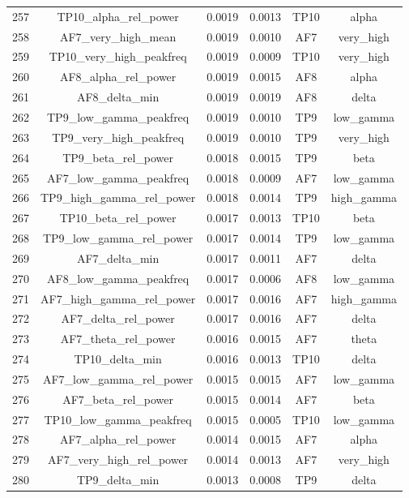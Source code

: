 \begin{table}[hptb]
\begin{table}
\begin{tabular}{cccccc}
257 & TP10_alpha_rel_power & 0.0019 & 0.0013 & TP10 & alpha \\
258 & AF7_very_high_mean & 0.0019 & 0.0010 & AF7 & very_high \\
259 & TP10_very_high_peakfreq & 0.0019 & 0.0009 & TP10 & very_high \\
260 & AF8_alpha_rel_power & 0.0019 & 0.0015 & AF8 & alpha \\
261 & AF8_delta_min & 0.0019 & 0.0019 & AF8 & delta \\
262 & TP9_low_gamma_peakfreq & 0.0019 & 0.0010 & TP9 & low_gamma \\
263 & TP9_very_high_peakfreq & 0.0019 & 0.0010 & TP9 & very_high \\
264 & TP9_beta_rel_power & 0.0018 & 0.0015 & TP9 & beta \\
265 & AF7_low_gamma_peakfreq & 0.0018 & 0.0009 & AF7 & low_gamma \\
266 & TP9_high_gamma_rel_power & 0.0018 & 0.0014 & TP9 & high_gamma \\
267 & TP10_beta_rel_power & 0.0017 & 0.0013 & TP10 & beta \\
268 & TP9_low_gamma_rel_power & 0.0017 & 0.0014 & TP9 & low_gamma \\
269 & AF7_delta_min & 0.0017 & 0.0011 & AF7 & delta \\
270 & AF8_low_gamma_peakfreq & 0.0017 & 0.0006 & AF8 & low_gamma \\
271 & AF7_high_gamma_rel_power & 0.0017 & 0.0016 & AF7 & high_gamma \\
272 & AF7_delta_rel_power & 0.0017 & 0.0016 & AF7 & delta \\
273 & AF7_theta_rel_power & 0.0016 & 0.0015 & AF7 & theta \\
274 & TP10_delta_min & 0.0016 & 0.0013 & TP10 & delta \\
275 & AF7_low_gamma_rel_power & 0.0015 & 0.0015 & AF7 & low_gamma \\
276 & AF7_beta_rel_power & 0.0015 & 0.0014 & AF7 & beta \\
277 & TP10_low_gamma_peakfreq & 0.0015 & 0.0005 & TP10 & low_gamma \\
278 & AF7_alpha_rel_power & 0.0014 & 0.0015 & AF7 & alpha \\
279 & AF7_very_high_rel_power & 0.0014 & 0.0013 & AF7 & very_high \\
280 & TP9_delta_min & 0.0013 & 0.0008 & TP9 & delta \\
\bottomrule
\end{tabular}
\end{table}
\end{table}
